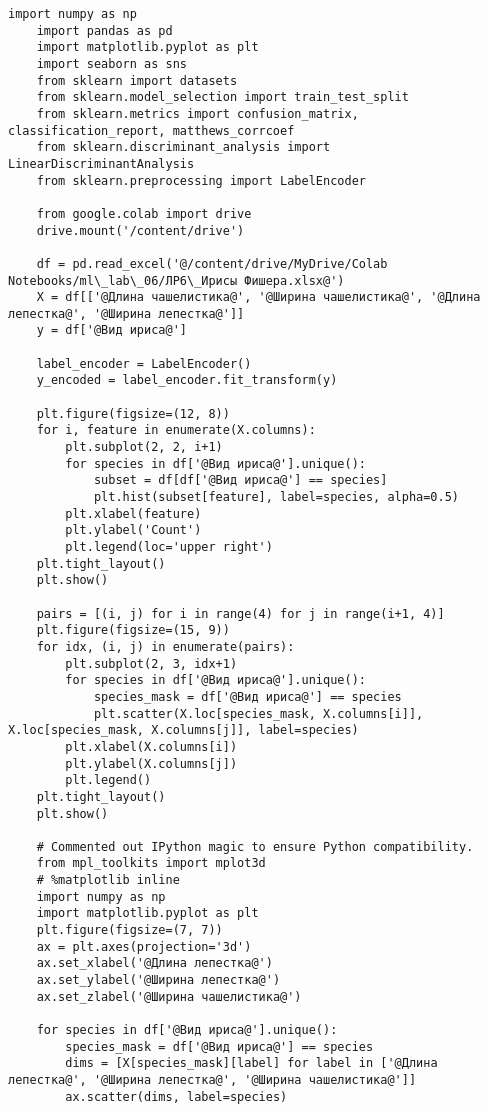\begin{lstlisting}[label=lst:1,caption=Классификация <<Ирисов Фишера>> с использованием байесовского подхода]
	import numpy as np
	import pandas as pd
	import matplotlib.pyplot as plt
	import seaborn as sns
	from sklearn import datasets
	from sklearn.model_selection import train_test_split
	from sklearn.metrics import confusion_matrix, classification_report, matthews_corrcoef
	from sklearn.discriminant_analysis import LinearDiscriminantAnalysis
	from sklearn.preprocessing import LabelEncoder
	
	from google.colab import drive
	drive.mount('/content/drive')
	
	df = pd.read_excel('@/content/drive/MyDrive/Colab Notebooks/ml\_lab\_06/ЛР6\_Ирисы Фишера.xlsx@')
	X = df[['@Длина чашелистика@', '@Ширина чашелистика@', '@Длина лепестка@', '@Ширина лепестка@']]
	y = df['@Вид ириса@']
	
	label_encoder = LabelEncoder()
	y_encoded = label_encoder.fit_transform(y)
	
	plt.figure(figsize=(12, 8))
	for i, feature in enumerate(X.columns):
		plt.subplot(2, 2, i+1)
		for species in df['@Вид ириса@'].unique():
			subset = df[df['@Вид ириса@'] == species]
			plt.hist(subset[feature], label=species, alpha=0.5)
		plt.xlabel(feature)
		plt.ylabel('Count')
		plt.legend(loc='upper right')
	plt.tight_layout()
	plt.show()
	
	pairs = [(i, j) for i in range(4) for j in range(i+1, 4)]
	plt.figure(figsize=(15, 9))
	for idx, (i, j) in enumerate(pairs):
		plt.subplot(2, 3, idx+1)
		for species in df['@Вид ириса@'].unique():
			species_mask = df['@Вид ириса@'] == species
			plt.scatter(X.loc[species_mask, X.columns[i]], X.loc[species_mask, X.columns[j]], label=species)
		plt.xlabel(X.columns[i])
		plt.ylabel(X.columns[j])
		plt.legend()
	plt.tight_layout()
	plt.show()
	
	# Commented out IPython magic to ensure Python compatibility.
	from mpl_toolkits import mplot3d
	# %matplotlib inline
	import numpy as np
	import matplotlib.pyplot as plt
	plt.figure(figsize=(7, 7))
	ax = plt.axes(projection='3d')
	ax.set_xlabel('@Длина лепестка@')
	ax.set_ylabel('@Ширина лепестка@')
	ax.set_zlabel('@Ширина чашелистика@')
	
	for species in df['@Вид ириса@'].unique():
		species_mask = df['@Вид ириса@'] == species
		dims = [X[species_mask][label] for label in ['@Длина лепестка@', '@Ширина лепестка@', '@Ширина чашелистика@']]
		ax.scatter(dims, label=species)
	

\end{lstlisting}
